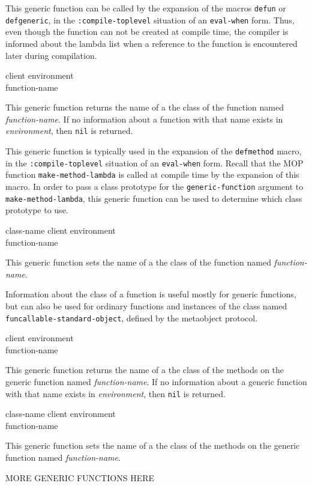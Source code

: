 This generic function can be called by the expansion of the macros
\texttt{defun} or \texttt{defgeneric}, in the
\texttt{:compile-toplevel} situation of an \texttt{eval-when} form.
Thus, even though the function can not be created at compile time, the
compiler is informed about the lambda list when a reference to the
function is encountered later during compilation.

 {client environment \\ function-name}

This generic function returns the name of a the class of the function
named \textit{function-name}.  If no information about a
function with that name exists in \textit{environment}, then
\texttt{nil} is returned.

This generic function is typically used in the expansion of the
\texttt{defmethod} macro, in the \texttt{:compile-toplevel} situation
of an \texttt{eval-when} form.  Recall that the MOP function
\texttt{make-method-lambda} is called at compile time by the expansion
of this macro.  In order to pass a class prototype for the
\texttt{generic-function} argument to \texttt{make-method-lambda},
this generic function can be used to determine which class prototype
to use.

 {class-name client environment \\
function-name}

This generic function sets the name of a the class of the function
named \textit{function-name}.

Information about the class of a function is useful mostly for generic
functions, but can also be used for ordinary functions and instances
of the class named \texttt{funcallable-standard-object}, defined by
the metaobject protocol.

 {client environment \\ function-name}

This generic function returns the name of a the class of the methods
on the generic function named \textit{function-name}.  If no information
about a generic function with that name exists in
\textit{environment}, then \texttt{nil} is returned.

 {class-name client environment \\
function-name}

This generic function sets the name of a the class of the methods on
the generic function named \textit{function-name}.

MORE GENERIC FUNCTIONS HERE
